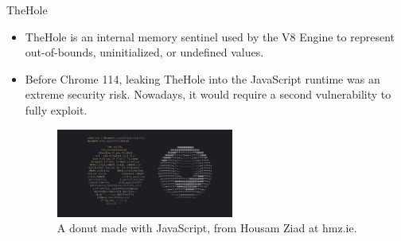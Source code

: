 \begin{frame}{TheHole}
    \begin{itemize}
        \item TheHole is an internal memory sentinel used by the V8 Engine to represent out-of-bounds, uninitialized, or undefined values.
        \item Before Chrome 114, leaking TheHole into the JavaScript runtime was an extreme security risk. Nowadays, it would require a second vulnerability to fully exploit. 
        \begin{figure}
            \centering
            \includegraphics[width=0.55\textwidth]{images/v8-donut.png}
            \caption{A donut made with JavaScript, from Housam Ziad at hmz.ie.}
            \label{fig:donut}
        \end{figure}
    \end{itemize}
\end{frame}


